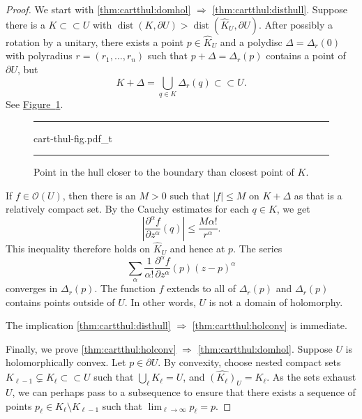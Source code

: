 \documentclass[12pt,openany]{book}
\newcommand{\sabs}[1]{\lvert {#1} \rvert}
\newcommand{\abs}[1]{\left\lvert {#1} \right\rvert}
\newcommand{\sO}{{\mathscr{O}}}
\theoremstyle{plain}
\theoremstyle{remark}
\theoremstyle{definition}
\newenvironment{myfig}{%
\begin{figure}[h!t]
\noindent\rule{\textwidth}{0.5pt}\vspace{12pt}\par\centering}%
{\par\noindent\rule{\textwidth}{0.5pt}
\end{figure}}
\theoremstyle{exercise}
\theoremstyle{example}
\newcommand{\figureref}[1]{\hyperref[#1]{Figure~\ref*{#1}}}
\begin{document}
\begin{proof}
We start with \ref{thm:cartthul:domhol} $\Rightarrow$
\ref{thm:cartthul:disthull}.
Suppose there is a $K \subset
\subset U$ with $\operatorname{dist}(K,\partial U) > \operatorname{dist}(\widehat{K}_U,\partial U)$.
After possibly a rotation by a unitary,
there exists a point $p \in \widehat{K}_U$ and a polydisc
$\Delta = \Delta_r(0)$ with polyradius $r = (r_1,\ldots,r_n)$ such that
$p + \Delta = \Delta_r(p)$ contains a point of $\partial U$, but
\begin{equation*}
K + \Delta = \bigcup_{q \in K} \Delta_r(q) \subset \subset U.
\end{equation*}
See \figureref{fig:cart-thul-fig}.

\begin{myfig}
{cart-thul-fig.pdf_t}
\caption{Point in the hull closer to the boundary than closest
point of $K$.\label{fig:cart-thul-fig}}
\end{myfig}

If $f \in \sO(U)$, then there is an $M > 0$ such that $\sabs{f} \leq M$ on
$K + \Delta$ as that is a relatively compact set.  By the Cauchy estimates
for each $q \in K$, we get
\begin{equation*}
\abs{\frac{\partial^\alpha f}{\partial z^\alpha}(q)} \leq \frac{M
\alpha!}{r^\alpha} .
\end{equation*}
This inequality therefore holds on $\widehat{K}_U$ and hence at $p$.
The series
\begin{equation*}
\sum_{\alpha}
\frac{1}{\alpha !}\frac{\partial^\alpha f}{\partial z^\alpha}(p) {(z-p)}^\alpha
\end{equation*}
converges in $\Delta_r(p)$.  The function $f$ extends to all of $\Delta_r(p)$ and
$\Delta_r(p)$ contains points outside of $U$.
In other words, $U$ is not a domain of holomorphy.

The implication \ref{thm:cartthul:disthull} $\Rightarrow$
\ref{thm:cartthul:holconv} is immediate.

Finally, we prove
\ref{thm:cartthul:holconv} $\Rightarrow$
\ref{thm:cartthul:domhol}.
Suppose $U$ is holomorphically convex.  Let $p \in \partial U$.
By convexity, choose nested compact sets $K_{\ell-1} \subsetneq K_\ell \subset
\subset U$ such that $\bigcup_\ell K_\ell = U$, and $\widehat{(K_\ell)}_U =
K_\ell$.
As the sets exhaust $U$, we can perhaps pass to a subsequence
to ensure that
there exists a
sequence of points $p_\ell \in K_\ell \setminus K_{\ell-1}$ such that
$\lim_{\ell\to\infty} p_\ell = p$.


\end{proof}
\end{document}
